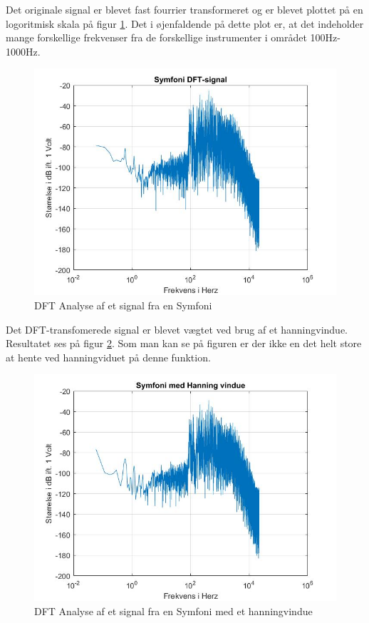 Det originale signal er blevet fast fourrier transformeret og er blevet plottet på en logoritmisk skala på figur \ref{fig:Symfoni DFT}. Det i øjenfaldende på dette plot er, at det indeholder mange forskellige frekvenser fra de forskellige instrumenter i området 100Hz-1000Hz.
\begin{figure}[H]
	\centering
	\includegraphics[width=140mm]{figures/Symfoni/DFT.jpg}
	\caption{DFT Analyse af et signal fra en Symfoni}
	\label{fig:Symfoni DFT}
\end{figure}

Det DFT-transfomerede signal er blevet vægtet ved brug af et hanningvindue. Resultatet ses på figur \ref{fig:Symfoni hanning}. Som man kan se på figuren er der ikke en det helt store at hente ved hanningviduet på denne funktion.
\begin{figure}[H]
	\centering
	\includegraphics[width=140mm]{figures/Symfoni/hanning.jpg}
	\caption{DFT Analyse af et signal fra en Symfoni med et hanningvindue}
	\label{fig:Symfoni hanning}
\end{figure}


